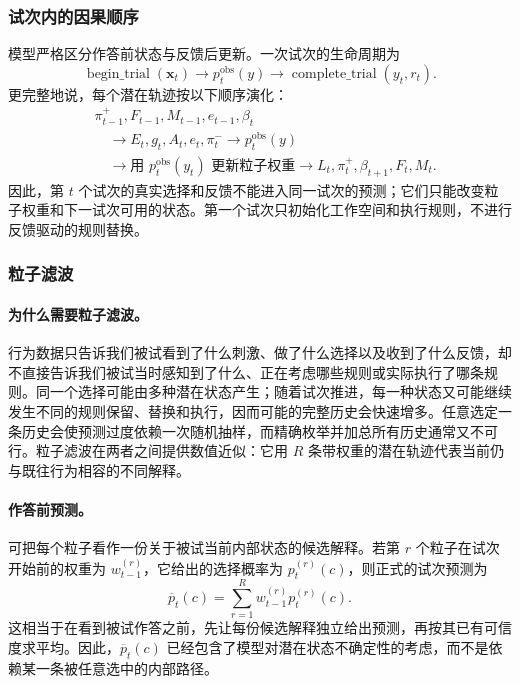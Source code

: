 \subsubsection{试次内的因果顺序}

模型严格区分作答前状态与反馈后更新。一次试次的生命周期为
\begin{equation}
\operatorname{begin\_trial}(\mathbf x_t)
\longrightarrow p_t^{\mathrm{obs}}(y)
\longrightarrow
\operatorname{complete\_trial}(y_t,r_t).
\label{eq:dynamic-lifecycle}
\end{equation}
更完整地说，每个潜在轨迹按以下顺序演化：
\begin{equation}
\begin{aligned}
&\pi_{t-1}^{+},F_{t-1},M_{t-1},e_{t-1},\beta_t
\\
&\quad\longrightarrow
E_t,g_t,A_t,e_t,\pi_t^{-}
\longrightarrow p_t^{\mathrm{obs}}(y)
\\
&\quad\longrightarrow
\text{用 }p_t^{\mathrm{obs}}(y_t)\text{ 更新粒子权重}
\longrightarrow L_t,\pi_t^{+},\beta_{t+1},F_t,M_t.
\end{aligned}
\label{eq:dynamic-causal-order}
\end{equation}
因此，第 $t$ 个试次的真实选择和反馈不能进入同一试次的预测；它们只能改变粒子权重和下一试次可用的状态。第一个试次只初始化工作空间和执行规则，不进行反馈驱动的规则替换。


\subsubsection{粒子滤波}

\paragraph{为什么需要粒子滤波。}
行为数据只告诉我们被试看到了什么刺激、做了什么选择以及收到了什么反馈，却不直接告诉我们被试当时感知到了什么、正在考虑哪些规则或实际执行了哪条规则。同一个选择可能由多种潜在状态产生；随着试次推进，每一种状态又可能继续发生不同的规则保留、替换和执行，因而可能的完整历史会快速增多。任意选定一条历史会使预测过度依赖一次随机抽样，而精确枚举并加总所有历史通常又不可行。粒子滤波在两者之间提供数值近似：它用 $R$ 条带权重的潜在轨迹代表当前仍与既往行为相容的不同解释。

\paragraph{作答前预测。}
可把每个粒子看作一份关于被试当前内部状态的候选解释。若第 $r$ 个粒子在试次开始前的权重为 $w_{t-1}^{(r)}$，它给出的选择概率为 $p_t^{(r)}(c)$，则正式的试次预测为
\begin{equation}
\overline p_t(c)
=\sum_{r=1}^{R}w_{t-1}^{(r)}p_t^{(r)}(c).
\label{eq:dynamic-pf-marginal}
\end{equation}
这相当于在看到被试作答之前，先让每份候选解释独立给出预测，再按其已有可信度求平均。因此，$\overline p_t(c)$ 已经包含了模型对潜在状态不确定性的考虑，而不是依赖某一条被任意选中的内部路径。

